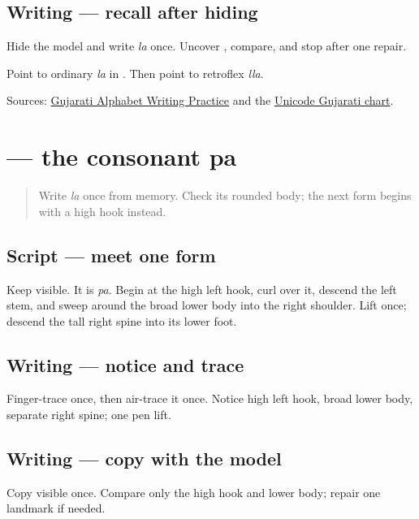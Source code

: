 \subsection*{Writing — recall after hiding}
Hide the model and write \emph{la} once. Uncover \textbf{}, compare, and stop after one repair.

\begin{tcolorbox}[breakable,colback=teal!4,colframe=teal!35!black,title={Before you move on}]
Point to ordinary \emph{la} in \textbf{ }. Then point to retroflex \emph{lla}.

Sources: \href{https://www.t30apps.com/gujarati-alphabet-writing/}{Gujarati Alphabet Writing Practice} and the \href{https://www.unicode.org/charts/PDF/U0A80.pdf}{Unicode Gujarati chart}.
\end{tcolorbox}
\section[\texorpdfstring{\gu{પ} (pa)}{પ (pa)}]{ — the consonant pa}

\label{lesson:GU-W05-pa}



\begin{quote}
Write \emph{la} once from memory. Check its rounded body; the next form begins with a high hook instead.
\end{quote}

\subsection*{Script — meet one form}
Keep \textbf{} visible. It is \emph{pa}. Begin at the high left hook, curl over it, descend the left stem, and sweep around the broad lower body into the right shoulder. Lift once; descend the tall right spine into its lower foot.

\subsection*{Writing — notice and trace}

Finger-trace \textbf{} once, then air-trace it once. Notice high left hook, broad lower body, separate right spine; one pen lift.

\subsection*{Writing — copy with the model}
Copy visible \textbf{} once. Compare only the high hook and lower body; repair one landmark if needed.

